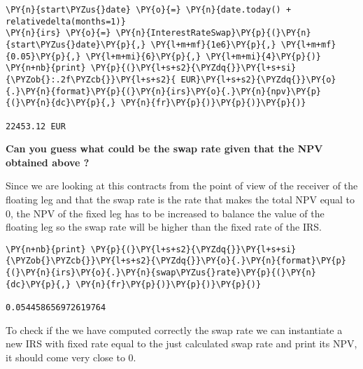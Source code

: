 \begin{tcolorbox}[breakable, size=fbox, boxrule=1pt, pad at break*=1mm,colback=cellbackground, colframe=cellborder]
\begin{Verbatim}[commandchars=\\\{\}]
\PY{n}{start\PYZus{}date} \PY{o}{=} \PY{n}{date.today() + relativedelta(months=1)}
\PY{n}{irs} \PY{o}{=} \PY{n}{InterestRateSwap}\PY{p}{(}\PY{n}{start\PYZus{}date}\PY{p}{,} \PY{l+m+mf}{1e6}\PY{p}{,} \PY{l+m+mf}{0.05}\PY{p}{,} \PY{l+m+mi}{6}\PY{p}{,} \PY{l+m+mi}{4}\PY{p}{)}
\PY{n+nb}{print} \PY{p}{(}\PY{l+s+s2}{\PYZdq{}}\PY{l+s+si}{\PYZob{}:.2f\PYZcb{}}\PY{l+s+s2}{ EUR}\PY{l+s+s2}{\PYZdq{}}\PY{o}{.}\PY{n}{format}\PY{p}{(}\PY{n}{irs}\PY{o}{.}\PY{n}{npv}\PY{p}{(}\PY{n}{dc}\PY{p}{,} \PY{n}{fr}\PY{p}{)}\PY{p}{)}\PY{p}{)}

22453.12 EUR
\end{Verbatim}
\end{tcolorbox}

\textbf{Can you guess what could be the \textbf{swap rate} given that the NPV obtained above ?}

Since we are looking at this contracts from the point of view
of the receiver of the floating leg and that the swap rate is the rate that makes the total NPV equal to 0, the NPV of the fixed leg has to be increased to balance the value of the floating leg so the swap rate will be higher than the fixed rate of the IRS.

\begin{tcolorbox}[breakable, size=fbox, boxrule=1pt, pad at break*=1mm,colback=cellbackground, colframe=cellborder]
\begin{Verbatim}[commandchars=\\\{\}]
\PY{n+nb}{print} \PY{p}{(}\PY{l+s+s2}{\PYZdq{}}\PY{l+s+si}{\PYZob{}\PYZcb{}}\PY{l+s+s2}{\PYZdq{}}\PY{o}{.}\PY{n}{format}\PY{p}{(}\PY{n}{irs}\PY{o}{.}\PY{n}{swap\PYZus{}rate}\PY{p}{(}\PY{n}{dc}\PY{p}{,} \PY{n}{fr}\PY{p}{)}\PY{p}{)}\PY{p}{)}

0.054458656972619764
\end{Verbatim}
\end{tcolorbox}
    
To check if the we have computed correctly the swap rate we can
instantiate a new IRS with fixed rate equal to the just calculated swap
rate and print its NPV, it should come very close to 0.

